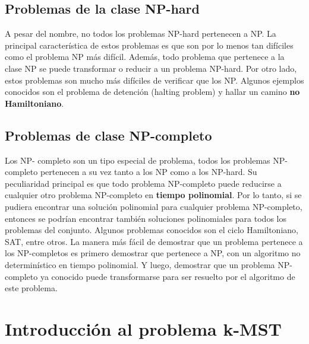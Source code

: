 \documentclass[spanish,12pt]{elsarticle}
\begin{document}
\subsection{Problemas de la clase NP-hard}
A pesar del nombre, no todos los problemas NP-hard pertenecen a NP. La principal característica de estos problemas es que son por lo menos tan difíciles como el problema NP más difícil. Además, todo problema que pertenece a la clase NP se puede transformar o reducir a un problema NP-hard. Por otro lado, estos problemas son mucho más difíciles de verificar que los NP. Algunos ejemplos conocidos son el problema de detención (halting problem) y hallar un camino \textbf{no Hamiltoniano}.


\subsection{Problemas de clase NP-completo}
Los NP- completo son un tipo especial de problema, todos los problemas NP-completo pertenecen a su vez tanto a los NP como a los NP-hard. Su peculiaridad principal es que todo problema NP-completo puede reducirse a cualquier otro problema NP-completo en \textbf{tiempo polinomial}. Por lo tanto, si se pudiera encontrar una solución polinomial para cualquier problema NP-completo, entonces se podrían encontrar también soluciones polinomiales para todos los problemas del conjunto. Algunos problemas conocidos son el ciclo Hamiltoniano, SAT, entre otros. La manera más fácil de demostrar que un problema pertenece a los NP-completos es primero demostrar que pertenece a NP, con un algoritmo no determinístico en tiempo polinomial. Y luego, demostrar que un problema NP-completo ya conocido puede transformarse para ser resuelto por el algoritmo de este problema.
\clearpage



\section{Introducción al problema k-MST}
\end{document}
